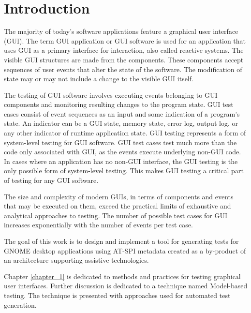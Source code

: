 
\chapter{Introduction}
The majority of today's software applications feature a graphical user interface (GUI). The term GUI application or GUI software is used for an application that uses GUI as a primary interface for interaction, also called reactive systems. The visible GUI structures are made from the components. These components accept sequences of user events that alter the state of the software. The modification of state may or may not include a change to the visible GUI itself. 

The testing of GUI software involves executing events belonging to GUI components and monitoring resulting changes to the program state. GUI test cases consist of event sequences as an input and some indication of a program's state. An indicator can be a GUI state, memory state, error log, output log, or any other indicator of runtime application state. GUI testing represents a form of system-level testing for GUI software. GUI test cases test much more than the code only associated with GUI, as the events execute underlying non-GUI code. In cases where an application has no non-GUI interface, the GUI testing is the only possible form of system-level testing. This makes GUI testing a critical part of testing for any GUI software.

The size and complexity of modern GUIs, in terms of components and events that may be executed on them, exceed the practical limits of exhaustive and analytical approaches to testing. The number of possible test cases for GUI increases exponentially with the number of events per test case.\cite{NguyenBao2014Gait}

The goal of this work is to design and implement a tool for generating tests for GNOME desktop applications using AT-SPI metadata created as a by-product of an architecture supporting assistive technologies.

Chapter \ref{chapter_1} is dedicated to methods and practices for testing graphical user interfaces. Further discussion is dedicated to a technique named Model-based testing. The technique is presented with approaches used for automated test generation. 

